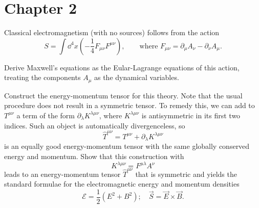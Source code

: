\section{Chapter 2}

\setcounter{equation}{66}
\problem Classical electromagnetism (with no sources) follows from the action
\begin{equation}
    S = \int \dd^4 x \left(-\frac{1}{4} F_{\mu\nu} F^{\mu\nu} \right), 
    \qquad \text{where } F_{\mu\nu} = \partial_\mu A_\nu - \partial_\nu A_\mu.
\end{equation}
\begin{problembody}
    \item Derive Maxwell's equations as the Eular-Lagrange equations of this action, treating the 
    components $A_\mu$ as the dynamical variables.
    \item Construct the energy-momentum tensor for this theory. Note that the usual procedure does
    not result in a symmetric tensor. To remedy this, we can add to $T^{\mu\nu}$ a term of the form 
    $\partial_\lambda K^{\lambda\mu\nu}$, where $K^{\lambda\mu\nu}$ is antisymmetric in its first two
    indices. Such an object is automatically divergenceless, so
    \begin{equation*}
        \widehat{T}^{\mu\nu} = T^{\mu\nu} + \partial_\lambda K^{\lambda\mu\nu}
    \end{equation*}
    is an equally good energy-momentum tensor with the same globally conserved energy and momentum. Show 
    that this construction with
    \begin{equation*}
        K^{\lambda\mu\nu} = F^{\mu\lambda} A^\nu
    \end{equation*}
    leads to an energy-momentum tensor $\widehat{T}^{\mu\nu}$ that is symmetric and yields the standard
    formulae for the electromagnetic energy and momentum densities
    \begin{equation*}
        \mathcal{E} = \frac{1}{2}(E^2 + B^2); \quad \vec{S} = \vec{E} \times \vec{B}.
    \end{equation*}
\end{problembody}

